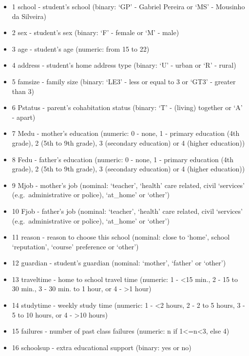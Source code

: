 \documentclass[
]{book}
\providecommand{\tightlist}{%
  \setlength{\itemsep}{0pt}\setlength{\parskip}{0pt}}
\theoremstyle{definition}
\theoremstyle{definition}
\theoremstyle{definition}
\theoremstyle{definition}
\theoremstyle{remark}
\begin{document}
\begin{itemize}
\tightlist
\item
  1 school - student's school (binary: `GP' - Gabriel Pereira or `MS' - Mousinho da Silveira)
\item
  2 sex - student's sex (binary: `F' - female or `M' - male)
\item
  3 age - student's age (numeric: from 15 to 22)
\item
  4 address - student's home address type (binary: `U' - urban or `R' - rural)
\item
  5 famsize - family size (binary: `LE3' - less or equal to 3 or `GT3' - greater than 3)
\item
  6 Pstatus - parent's cohabitation status (binary: `T' - (living) together or `A' - apart)
\item
  7 Medu - mother's education (numeric: 0 - none, 1 - primary education (4th grade), 2 (5th to 9th grade), 3 (secondary education) or 4 (higher education))
\item
  8 Fedu - father's education (numeric: 0 - none, 1 - primary education (4th grade), 2 (5th to 9th grade), 3 (secondary education) or 4 (higher education))
\item
  9 Mjob - mother's job (nominal: `teacher', `health' care related, civil `services' (e.g.~administrative or police), `at\_home' or `other')
\item
  10 Fjob - father's job (nominal: `teacher', `health' care related, civil `services' (e.g.~administrative or police), `at\_home' or `other')
\item
  11 reason - reason to choose this school (nominal: close to `home', school `reputation', `course' preference or `other')
\item
  12 guardian - student's guardian (nominal: `mother', `father' or `other')
\item
  13 traveltime - home to school travel time (numeric: 1 - \textless15 min., 2 - 15 to 30 min., 3 - 30 min. to 1 hour, or 4 - \textgreater1 hour)
\item
  14 studytime - weekly study time (numeric: 1 - \textless2 hours, 2 - 2 to 5 hours, 3 - 5 to 10 hours, or 4 - \textgreater10 hours)
\item
  15 failures - number of past class failures (numeric: n if 1\textless=n\textless3, else 4)
\item
  16 schoolsup - extra educational support (binary: yes or no)
\end{itemize}
\end{document}
